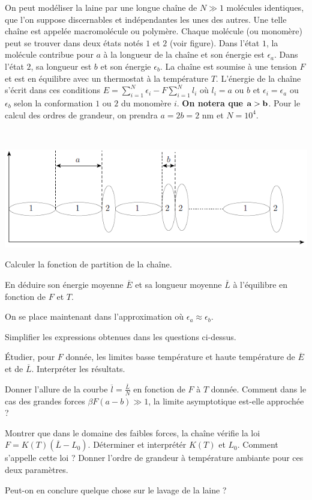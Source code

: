 On peut modéliser la laine par une longue chaîne de $N \gg 1$ molécules identiques, que l'on suppose discernables et indépendantes les unes des autres. Une telle chaîne est appelée macromolécule ou polymère. Chaque molécule (ou monomère) peut se trouver
dans deux états notés $1$ et $2$ (voir figure). Dans l’état $1$, la molécule contribue pour $a$ à la longueur de la
chaîne et son énergie est $\epsilon_{a}$. Dans l’état $2$, sa longueur est $b$ et son énergie $\epsilon_{b}$. La chaîne est
soumise à une tension $F$ et est en équilibre avec un thermostat à la température $T$. L'énergie de la chaîne s'écrit dans ces conditions $E=\sum_{i=1}^{N} \epsilon_i-F\sum_{i=1}^{N} l_i$ où $l_i=a$ ou $b$ et $\epsilon_i=\epsilon_{a}$ ou $\epsilon_{b}$ selon la conformation $1$ ou $2$ du monomère $i$. {\bf On notera que $\bf a > b$}. Pour le calcul des ordres de
grandeur, on prendra $a = 2b = 2$ nm et $N = 10^4$.

\ 

\centerline{\includegraphics[height=.17\textwidth]{../Fig/keratine}}

\question Calculer la fonction de partition de la chaîne. 

\question En déduire son énergie moyenne $\overline{E}$ et sa longueur moyenne $\overline{L}$ à l'équilibre en fonction de $F$ et $T$.

On se place maintenant dans l'approximation où $\epsilon_{a} \approx \epsilon_{b}$.

\question Simplifier les expressions obtenues dans les questions ci-dessus.

\question \'Etudier, pour $F$ donnée, les limites basse température et haute température  de $\overline{E}$ et de $\overline{L}$. Interpréter les résultats.

\question Donner l'allure de la courbe $\overline{l}=\frac{\overline{L}}{N}$ en fonction de $F$ à $T$ donnée. Comment dans le cas des grandes forces $\beta F (a-b) \gg 1$, la limite asymptotique est-elle approchée ?

\question Montrer que dans le domaine des faibles forces, la chaîne vérifie la loi $F=K(T) (\overline{L} - L_0)$. Déterminer et interprétér $K(T)$ et $L_0$. Comment s'appelle cette loi ? Donner l'ordre de grandeur à température ambiante pour ces deux paramètres.

\question Peut-on en conclure quelque chose sur le lavage de la laine ?
